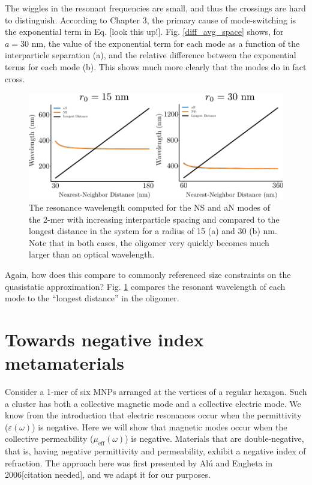 \documentclass [11pt, proquest] {uwthesis}[2016/11/22]
\begin{document}
The wiggles in the resonant frequencies are small, and thus the crossings are hard to distinguish. According to Chapter 3, the primary cause of mode-switching is the exponential term in Eq. [look this up!]. Fig. \ref{diff_avg_space} shows, for $a=30$ nm, the value of the exponential term for each mode as a function of the interparticle separation (a), and the relative difference between the exponential terms for each mode (b). This shows much more clearly that the modes do in fact cross.

\begin{figure}
\begin{centering}
\includegraphics{length_comp_sapcing.pdf}
\caption{The resonance wavelength computed for the NS and aN modes of the 2-mer with increasing interparticle spacing and compared to the longest distance in the system for a radius of 15 (a) and 30 (b) nm. Note that in both cases, the oligomer very quickly becomes much larger than an optical wavelength.}
\label{length_space}
\end{centering}
\end{figure}


Again, how does this compare to commonly referenced size constraints on the quasistatic approximation? Fig. \ref{length_space} compares the resonant wavelength of each mode to the ``longest distance'' in the oligomer.


\section{Towards negative index metamaterials}

Consider a 1-mer of six MNPs arranged at the vertices of a regular hexagon. Such a cluster has both a collective magnetic mode and a collective electric mode. We know from the introduction that electric resonances occur when the permittivity ($\varepsilon(\omega)$) is negative. Here we will show that magnetic modes occur when the collective permeability ($\mu_{\textrm{eff}}(\omega)$) is negative. Materials that are double-negative, that is, having negative permittivity and permeability, exhibit a negative index of refraction. The approach here was first presented by Al\'{u} and Engheta in 2006[citation needed], and we adapt it for our purposes.
\end{document}
